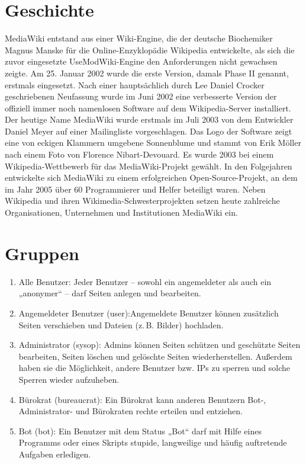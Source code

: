 \section{Geschichte}
MediaWiki entstand aus einer Wiki-Engine, die der deutsche Biochemiker Magnus Manske für die Online-Enzyklopädie Wikipedia entwickelte, als sich die zuvor eingesetzte UseModWiki-Engine den Anforderungen nicht gewachsen zeigte. Am 25. Januar 2002 wurde die erste Version, damals Phase II genannt, erstmals eingesetzt. Nach einer hauptsächlich durch Lee Daniel Crocker geschriebenen Neufassung wurde im Juni 2002 eine verbesserte Version der offiziell immer noch namenlosen Software auf dem Wikipedia-Server installiert. Der heutige Name MediaWiki wurde erstmals im Juli 2003 von dem Entwickler Daniel Meyer auf einer Mailingliste vorgeschlagen. Das Logo der Software zeigt eine von eckigen Klammern umgebene Sonnenblume und stammt von Erik Möller nach einem Foto von Florence Nibart-Devouard. Es wurde 2003 bei einem Wikipedia-Wettbewerb für das MediaWiki-Projekt gewählt. In den Folgejahren entwickelte sich MediaWiki zu einem erfolgreichen Open-Source-Projekt, an dem im Jahr 2005 über 60 Programmierer und Helfer beteiligt waren. Neben Wikipedia und ihren Wikimedia-Schwesterprojekten setzen heute zahlreiche Organisationen, Unternehmen und Institutionen MediaWiki ein.
\section{Gruppen}
\begin{enumerate}
	\item Alle Benutzer:
	Jeder Benutzer – sowohl ein angemeldeter als auch ein „anonymer“ – darf Seiten anlegen und bearbeiten.
	\item Angemeldeter Benutzer (user):Angemeldete Benutzer können zusätzlich Seiten verschieben und Dateien (z. B. Bilder) hochladen.
	\item Administrator (sysop): Admins können Seiten schützen und geschützte Seiten bearbeiten, Seiten löschen und gelöschte Seiten wiederherstellen. Außerdem haben sie die Möglichkeit, andere Benutzer bzw. IPs zu sperren und solche Sperren wieder aufzuheben.
	\item Bürokrat (bureaucrat): Ein Bürokrat kann anderen Benutzern Bot-, Administrator- und Bürokraten rechte erteilen und entziehen.
	\item Bot (bot): Ein Benutzer mit dem Status „Bot“ darf mit Hilfe eines Programms oder eines Skripts stupide, langweilige und häufig auftretende Aufgaben erledigen.
\end{enumerate}


